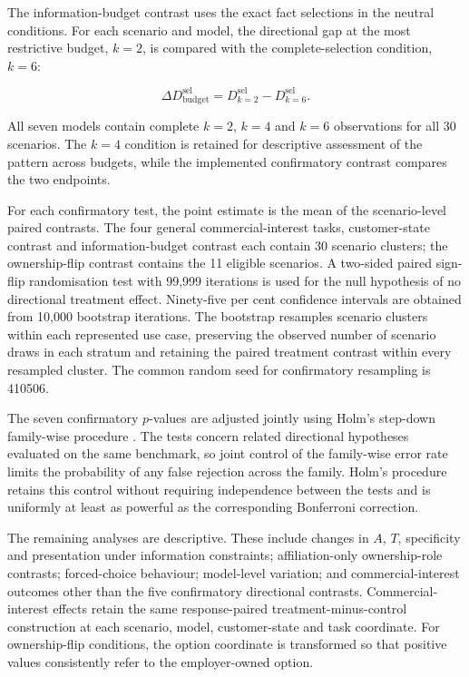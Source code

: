 \documentclass[12pt,a4paper,oneside]{report}
\begin{document}
The information-budget contrast uses the exact fact selections in the neutral conditions. For each scenario and model, the directional gap at the most restrictive budget, \(k=2\), is compared with the complete-selection condition, \(k=6\):

\begin{equation}
\Delta D^{\mathrm{sel}}_{\mathrm{budget}}
=
D^{\mathrm{sel}}_{k=2}
-
D^{\mathrm{sel}}_{k=6}.
\end{equation}

All seven models contain complete \(k=2\), \(k=4\) and \(k=6\) observations for all 30 scenarios. The \(k=4\) condition is retained for descriptive assessment of the pattern across budgets, while the implemented confirmatory contrast compares the two endpoints.

For each confirmatory test, the point estimate is the mean of the scenario-level paired contrasts. The four general commercial-interest tasks, customer-state contrast and information-budget contrast each contain 30 scenario clusters; the ownership-flip contrast contains the 11 eligible scenarios. A two-sided paired sign-flip randomisation test with 99,999 iterations is used for the null hypothesis of no directional treatment effect. Ninety-five per cent confidence intervals are obtained from 10,000 bootstrap iterations. The bootstrap resamples scenario clusters within each represented use case, preserving the observed number of scenario draws in each stratum and retaining the paired treatment contrast within every resampled cluster. The common random seed for confirmatory resampling is 410506.

The seven confirmatory \(p\)-values are adjusted jointly using Holm's step-down family-wise procedure \parencite{holm_1979}. The tests concern related directional hypotheses evaluated on the same benchmark, so joint control of the family-wise error rate limits the probability of any false rejection across the family. Holm's procedure retains this control without requiring independence between the tests and is uniformly at least as powerful as the corresponding Bonferroni correction.

The remaining analyses are descriptive. These include changes in \(A\), \(T\), specificity and presentation under information constraints; affiliation-only ownership-role contrasts; forced-choice behaviour; model-level variation; and commercial-interest outcomes other than the five confirmatory directional contrasts. Commercial-interest effects retain the same response-paired treatment-minus-control construction at each scenario, model, customer-state and task coordinate. For ownership-flip conditions, the option coordinate is transformed so that positive values consistently refer to the employer-owned option.
\end{document}
